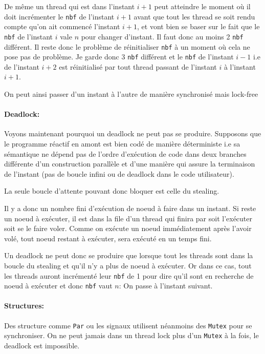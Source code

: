 \documentclass[a4paper]{article}
\renewcommand{\(}{\left(}
\renewcommand{\)}{\right)}
\begin{document}
De même un thread qui est dans l'instant $i+1$ peut atteindre le moment où il
doit incrémenter le \verb!nbf! de l'instant $i+1$ avant que tout les thread se
soit rendu compte qu'on ait commencé l'instant $i+1$, et vont bien se baser sur
le fait que le \verb!nbf! de l'instant $i$ vale $n$ pour changer d'instant. Il
faut donc au moins 2 \verb!nbf! différent. Il reste donc le problème de
réinitialiser \verb!nbf! à un moment où cela ne pose pas de problème. Je garde
donc 3 \verb!nbf! différent et le \verb!nbf! de l'instant $i-1$ i.e de l'instant
$i+2$ est réinitialisé par tout thread passant de l'instant $i$ à l'instant $i+1$.

On peut ainsi passer d'un instant à l'autre de manière synchronisé mais lock-free

\paragraph{Deadlock:} Voyons maintenant pourquoi un deadlock ne peut pas se
produire. Supposons que le programme réactif en amont est bien codé de manière
déterministe i.e sa sémantique ne dépend pas de l'ordre d'exécution de code dans
deux branches différente d'un construction parallèle et d'une manière qui assure
la terminaison de l'instant (pas de boucle infini ou de deadlock dans le code
utilisateur).

La seule boucle d'attente pouvant donc bloquer est celle du stealing.

Il y a donc un nombre fini d'exécution de noeud à faire dans un instant.
Si reste un noeud à exécuter, il est dans la file d'un thread qui finira
par soit l'exécuter soit se le faire voler. Comme on exécute un noeud
immédiatement après l'avoir volé, tout noeud restant à exécuter, sera exécuté
en un temps fini.

Un deadlock ne peut donc se produire que lorsque tout les threads sont dans la
boucle du stealing et qu'il n'y a plus de noeud à exécuter. Or dans ce cas, tout
les threads auront incrémenté leur \verb!nbf! de 1 pour dire qu'il sont en
recherche de noeud à exécuter et donc \verb!nbf! vaut $n$: On passe à l'instant
suivant.

\paragraph{Structures:} Des structure comme \verb!Par! ou les signaux utilisent
néanmoins des \verb!Mutex! pour se synchroniser. On ne peut jamais dans un
thread lock plus d'un \verb!Mutex! à la fois, le deadlock est impossible.
\end{document}
